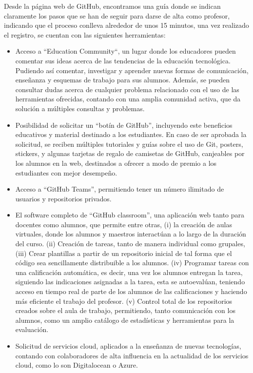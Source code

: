 \begin{itemize}
  Desde la página web de GitHub, encontramos una guía donde se indican
  claramente los pasos que se han de seguir para darse de alta como
  profesor, indicando que el proceso conlleva alrededor de unos 15 minutos,
  una vez realizado el registro, se cuentan con las siguientes
  herramientas:
  \begin{itemize}
  \item Acceso a “Education Community“, un lugar donde los educadores
    pueden comentar sus ideas acerca de las tendencias de la educación
    tecnológica. Pudiendo así comentar, investigar y aprender nuevas formas
    de comunicación, enseñanza y esquemas de trabajo para sus alumnos.
    Además, se pueden consultar dudas acerca de cualquier problema
    relacionado con el uso de las herramientas ofrecidas, contando con una
    amplia comunidad activa, que da solución a múltiples consultas y
    problemas.
  \item Posibilidad de solicitar un “botín de GitHub”, incluyendo este
    beneficios educativos y material destinado a los estudiantes. En caso
    de ser aprobada la solicitud, se reciben múltiples tutoriales y guías
    sobre el uso de Git, posters, stickers, y algunas tarjetas de regalo de
    camisetas de GitHub, canjeables por los alumnos en la web, destinados a
    ofrecer a modo de premio a los estudiantes con mejor desempeño.
  \item Acceso a “GitHub Teams”, permitiendo tener un número ilimitado de
    usuarios y repositorios privados.
  \item El software completo de “GitHub classroom”, una aplicación web
    tanto para docentes como alumnos, que permite entre otras, (i) la
    creación de aulas virtuales, donde los alumnos y maestros interactúan a
    lo largo de la duración del curso. (ii) Creación de tareas, tanto de
    manera individual como grupales, (iii) Crear plantillas a partir de un
    repositorio inicial de tal forma que el código sea sencillamente
    distribuible a los alumnos. (iv) Programar tareas con una calificación
    automática, es decir, una vez los alumnos entregan la tarea, siguiendo
    las indicaciones asignadas a la tarea, esta se autoevalúan, teniendo
    acceso en tiempo real de parte de los alumnos de las calificaciones y
    haciendo más eficiente el trabajo del profesor. (v) Control total de
    los repositorios creados sobre el aula de trabajo, permitiendo, tanto
    comunicación con los alumnos, como un amplio catálogo de estadísticas y
    herramientas para la evaluación.
  \item Solicitud de servicios cloud, aplicados a la enseñanza de nuevas
    tecnologías, contando con colaboradores de alta influencia en la
    actualidad de los servicios cloud, como lo son Digitalocean o Azure.
  \end{itemize}


\end{itemize}
